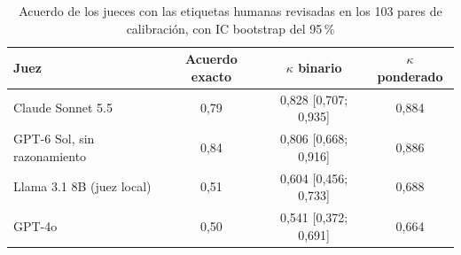 \begin{table}[htbp!]
    \centering
    \caption{Acuerdo de los jueces con las etiquetas humanas revisadas en los 103 pares de calibración, con IC bootstrap del 95\,\%}
    \label{tab:res-kappa-cal}
    \small
    \begin{tabular}{|l|c|c|c|}
        \hline
        \textbf{Juez} & \textbf{Acuerdo exacto} & \textbf{$\kappa$ binario} & \textbf{$\kappa$ ponderado} \\
        \hline
        Claude Sonnet 5.5 & 0{,}79 & 0{,}828 [0{,}707; 0{,}935] & 0{,}884 \\
        \hline
        GPT-6 Sol, sin razonamiento & 0{,}84 & 0{,}806 [0{,}668; 0{,}916] & 0{,}886 \\
        \hline
        Llama 3.1 8B (juez local) & 0{,}51 & 0{,}604 [0{,}456; 0{,}733] & 0{,}688 \\
        \hline
        GPT-4o & 0{,}50 & 0{,}541 [0{,}372; 0{,}691] & 0{,}664 \\
        \hline
    \end{tabular}
\end{table}
